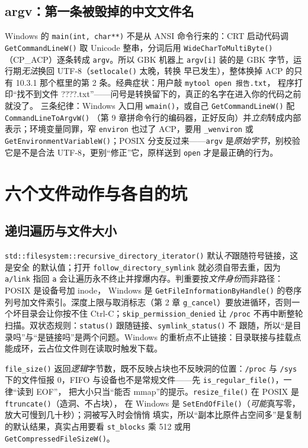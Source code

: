 \documentclass[12pt,a4paper,fontset=fandol]{ctexbook}
\newcommand{\Fn}[1]{\texttt{#1()}}
\newcommand{\Tp}[1]{\texttt{#1}}
\newcommand{\Bk}{\allowbreak}
\begin{document}
\subsection{argv：第一条被毁掉的中文文件名}

Windows 的 \Tp{main(int, char**)} 不是从 ANSI 命令行来的：CRT 启动代码调 \Fn{GetCommandLineW}
取 Unicode 整串，分词后用 \Fn{WideCharToMultiByte}（CP\_ACP）逐条转成 \Tp{argv}。所以 GBK
机器上 \Tp{argv[i]} 装的是 GBK 字节，运行期\emph{无法}换回 UTF-8（\Fn{setlocale} 太晚，转换
早已发生），整体换掉 ACP 的只有 10.3.1 那个框里的第 2 条。经典症状：用户敲 \Tp{mytool open 报告.txt}，
程序打印``找不到文件 ????.txt''——问号是转换留下的，真正的名字在进入你的代码之前就没了。
三条纪律：Windows 入口用 \Fn{wmain}，或自己 \Fn{GetCommandLineW} 配 \Fn{CommandLineToArgvW}
（第 9 章拼命令行的编码器，正好反向）并\emph{立刻}转成内部表示；环境变量同罪，窄
\Tp{environ} 也过了 ACP，要用 \Tp{\_wenviron} 或 \Fn{GetEnvironment\Bk VariableW}；POSIX
分支反过来——\Tp{argv} 是\emph{原始字节}，别校验它是不是合法 UTF-8，更别``修正''它，原样送到 \Tp{open} 才是最正确的行为。

\section{六个文件动作与各自的坑}

\subsection{递归遍历与文件大小}

\Fn{std::filesystem::\Bk recursive\_directory\_iterator} 默认\emph{不}跟随符号链接，这是安全
的默认值；打开 \Tp{follow\_directory\_symlink} 就必须自带去重，因为 \Tp{a/link} 指回 \Tp{a}
会让遍历永不终止并撑爆内存。判重要按\emph{文件身份}而非路径：POSIX 是设备号加 inode，
Windows 是 \Fn{GetFileInformationByHandle} 的卷序列号加文件索引。深度上限与取消标志（第 2 章
\Tp{g\_cancel}）要放进循环，否则一个坏目录会让你按不住 Ctrl-C；\Tp{skip\_permission\Bk \_denied}
让 \Tp{/proc} 不再中断整轮扫描。双状态规则：\Fn{status} 跟随链接、\Fn{symlink\_status} 不
跟随，所以``是目录吗''与``是链接吗''是两个问题。Windows 的重析点不止链接：目录联接与挂载点能成环，云占位文件则在读取时触发下载。

\Fn{file\_size} 返回\emph{逻辑}字节数，既不反映占块也不反映洞的位置：\Tp{/proc} 与 \Tp{/sys}
下的文件恒报 0，FIFO 与设备也不是常规文件——先 \Fn{is\_regular\_file}，一律``读到 EOF''，
把大小只当``能否 mmap''的提示。\Fn{resize\_file} 在 POSIX 是 \Fn{ftruncate}（造洞、不占块），
在 Windows 是 \Fn{SetEndOfFile}（\emph{可能}真写零，放大可慢到几十秒）；洞被写入时会悄悄
填实，所以``副本比原件占空间多''是复制的默认结果，真实占用要看 \Tp{st\_blocks} 乘 512 或用 \Fn{GetCompressedFileSizeW}。
\end{document}
